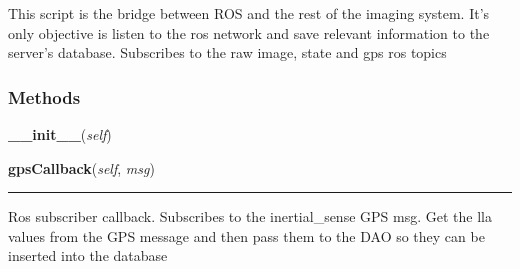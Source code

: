    \label{src:ros_ingest:RosIngester}
This script is the bridge between ROS and the rest of the imaging system. 
It's only objective is listen to the ros network and save relevant 
information to the server's database. Subscribes to the raw image, state 
and gps ros topics



  \subsubsection{Methods}

    \label{src:ros_ingest:RosIngester:__init__}

    \vspace{0.5ex}

\hspace{.8\funcindent}\begin{boxedminipage}{\funcwidth}

    \raggedright \textbf{\_\_init\_\_}(\textit{self})

\setlength{\parskip}{2ex}
\setlength{\parskip}{1ex}
    \end{boxedminipage}

    \label{src:ros_ingest:RosIngester:gpsCallback}

    \vspace{0.5ex}

\hspace{.8\funcindent}\begin{boxedminipage}{\funcwidth}

    \raggedright \textbf{gpsCallback}(\textit{self}, \textit{msg})

    \vspace{-1.5ex}

    \rule{\textwidth}{0.5\fboxrule}
\setlength{\parskip}{2ex}
    Ros subscriber callback. Subscribes to the inertial\_sense GPS msg. Get
    the lla values from the GPS message and then pass them to the DAO so 
    they can be inserted into the database

\setlength{\parskip}{1ex}
    \end{boxedminipage}

